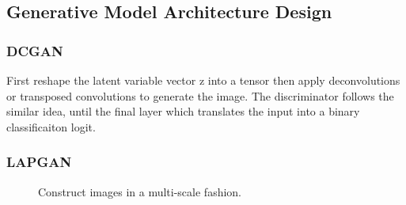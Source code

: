 \documentclass[11pt]{article}
\begin{document}
\subsection{Generative Model Architecture Design}

\subsubsection{DCGAN}

\begin{figure}[H]
    \centering
\end{figure}

First reshape the latent variable vector z into a tensor then apply deconvolutions or transposed convolutions to generate the image. The discriminator follows the similar idea, until the final layer which translates the input into a binary classificaiton logit.

\subsubsection{LAPGAN}

\begin{figure}[H]
    \centering
    \caption*{Construct images in a multi-scale fashion. }
\end{figure}
\end{document}
